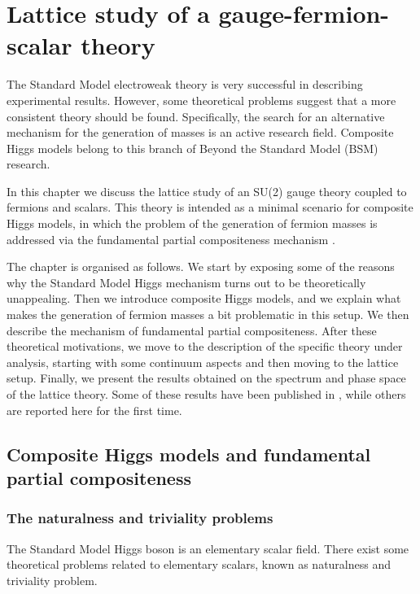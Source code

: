 \chapter{Lattice study of a gauge-fermion-scalar theory}

The Standard Model electroweak theory is very successful in describing experimental results. However, some theoretical problems suggest that a more consistent theory should be found. Specifically, the search for an alternative mechanism for the generation of masses is an active research field.
Composite Higgs models belong to this branch of Beyond the Standard Model (BSM) research.

In this chapter we discuss the lattice study of an SU(2) gauge theory coupled to fermions and scalars. This theory is intended as a minimal scenario for composite Higgs models, in which the problem of the generation of fermion masses is addressed via the fundamental partial compositeness mechanism \cite{Sannino:2016sfx}. 

The chapter is organised as follows. We start by exposing some of the reasons why the Standard Model Higgs mechanism turns out to be theoretically unappealing. Then we introduce composite Higgs models, and we explain what makes the generation of fermion masses a bit problematic in this setup. We then describe the mechanism of fundamental partial compositeness.
After these theoretical motivations, we move to the description of the specific theory under analysis, starting with some continuum aspects and then moving to the lattice setup. Finally,  we present the results obtained on the spectrum and phase space of the lattice theory. Some of these results have been published in \cite{Hansen:2017mrt}, while others are reported here for the first time.



\section{Composite Higgs models and fundamental partial compositeness}


\subsection{The naturalness and triviality problems}

The Standard Model Higgs boson is an elementary scalar field. There exist some theoretical problems related to elementary scalars, known as naturalness and triviality problem. 

